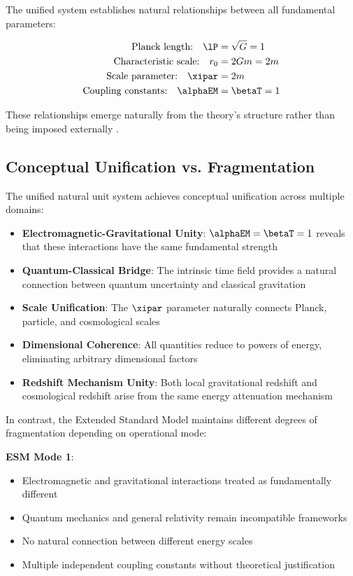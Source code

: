 	The unified system establishes natural relationships between all fundamental parameters:
	
	\begin{align}
		\text{Planck length:} \quad \lP &= \sqrt{G} = 1 \nonumber\\
		\text{Characteristic scale:} \quad r_0 &= 2Gm = 2m \nonumber\\
		\text{Scale parameter:} \quad \xipar &= 2m \nonumber\\
		\text{Coupling constants:} \quad \alphaEM &= \betaT = 1 \nonumber
	\end{align}
	
	These relationships emerge naturally from the theory's structure rather than being imposed externally \cite{pascher_beta_derivation_2025}.
	
	\subsection{Conceptual Unification vs. Fragmentation}
	\label{subsec:unification_fragmentation}
	
	The unified natural unit system achieves conceptual unification across multiple domains:
	
	\begin{itemize}
		\item \textbf{Electromagnetic-Gravitational Unity}: $\alphaEM = \betaT = 1$ reveals that these interactions have the same fundamental strength
		\item \textbf{Quantum-Classical Bridge}: The intrinsic time field provides a natural connection between quantum uncertainty and classical gravitation
		\item \textbf{Scale Unification}: The $\xipar$ parameter naturally connects Planck, particle, and cosmological scales
		\item \textbf{Dimensional Coherence}: All quantities reduce to powers of energy, eliminating arbitrary dimensional factors
		\item \textbf{Redshift Mechanism Unity}: Both local gravitational redshift and cosmological redshift arise from the same energy attenuation mechanism \cite{Pound1960}
	\end{itemize}
	
	In contrast, the Extended Standard Model maintains different degrees of fragmentation depending on operational mode:
	
	\textbf{ESM Mode 1}:
	\begin{itemize}
		\item Electromagnetic and gravitational interactions treated as fundamentally different
		\item Quantum mechanics and general relativity remain incompatible frameworks
		\item No natural connection between different energy scales
		\item Multiple independent coupling constants without theoretical justification
	\end{itemize}
	
